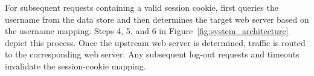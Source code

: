 
For subsequent requests containing a valid session cookie, \dbltr{} first queries the username from the data store and then determines the target web server based on the username mapping. 
Steps 4, 5, and 6 in Figure~\ref{fig:system_architecture} depict this process. 
Once the upstream web server is determined, traffic is routed to the corresponding web server. 
Any subsequent log-out requests and timeouts invalidate the session-cookie mapping.